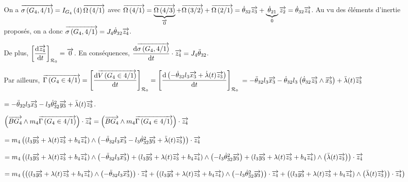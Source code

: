 \documentclass[10pt,fleqn]{article} %
\begin{document}
On a $\overrightarrow{\sigma \left( {G_4}, {4} /{1}\right)} =I_{G_4}\left( 4\right) \overrightarrow{\Omega\left( {4}/{1}\right)}$ avec $\overrightarrow{\Omega\left( {4}/{1}\right)}=\underbrace{\overrightarrow{\Omega\left( {4}/{3}\right)}}_{\overrightarrow{0}}+\overrightarrow{\Omega\left( {3}/{2}\right)}+\overrightarrow{\Omega\left( {2}/{1}\right)} =\dot{\theta}_{32} \overrightarrow{z_3}+\underbrace{\dot{\theta}_{21}}_{0} \overrightarrow{z_2}=\dot{\theta}_{32} \overrightarrow{z_4}$. Au vu des éléments d'inertie proposés, on a donc 
$\overrightarrow{\sigma \left( {G_4}, {4} /{1}\right)}=J_4\dot{\theta}_{32} \overrightarrow{z_4}$.

De plus, $ \left[ \dfrac{ \text{d} \overrightarrow{z_4}}{\text{d} t} \right]_{\mathcal{R}_{0}} = \overrightarrow{0} $. 
En conséquences, $\dfrac{\text{d} \overrightarrow{\sigma \left( {G_4}, {4} /{1}\right)}}{\text{d} t} \cdot\overrightarrow{z_4} = J_4\ddot{\theta}_{32}$.

Par ailleurs, $\overrightarrow{\Gamma \left( {G_4} \in {4}/{1}\right)}= \left[\dfrac{\text{d} \overrightarrow{V\left( {G_4} \in {4}/{1}\right)}}{\text{d} t} \right]_{\mathcal{R}_{0}}=\left[\dfrac{\text{d} \left( -\dot{\theta}_{32}l_3\overrightarrow{x_3}  + \dot{\lambda}(t)\overrightarrow{z_3} \right)}{\text{d} t} \right]_{\mathcal{R}_{0}}$
$= -\ddot{\theta}_{32}l_3\overrightarrow{x_3} -\dot{\theta}_{32}l_3    \left(\dot{\theta}_{32} \overrightarrow{z_3}\wedge \overrightarrow{x_3} \right)  + \ddot{\lambda}(t)\overrightarrow{z_3}  $

$= -\ddot{\theta}_{32}l_3\overrightarrow{x_3} -l_3   \dot{\theta}_{32}^2  \overrightarrow{y_3} + \ddot{\lambda}(t)\overrightarrow{z_3}  $.

$\left(\overrightarrow{BG_4}\wedge m_4 \overrightarrow{\Gamma \left( {G_4} \in {4}/{1}\right)}\right)\cdot\overrightarrow{z_4} = 
\left(\overrightarrow{BG_4}\wedge m_4 \overrightarrow{\Gamma \left( {G_4} \in {4}/{1}\right)}\right)\cdot\overrightarrow{z_4} $

$= m_4\left( \left(l_3 \overrightarrow{y_3} + \lambda(t) \overrightarrow{z_3}+ b_4 \overrightarrow{z_4}\right) \wedge  \left(-\ddot{\theta}_{32}l_3\overrightarrow{x_3} -l_3   \dot{\theta}_{32}^2  \overrightarrow{y_3} + \ddot{\lambda}(t)\overrightarrow{z_3} \right) \right)\cdot \overrightarrow{z_4}$

$= m_4\left( \left(l_3 \overrightarrow{y_3} + \lambda(t) \overrightarrow{z_3}+ b_4 \overrightarrow{z_4}\right) \wedge  \left(-\ddot{\theta}_{32}l_3\overrightarrow{x_3}\right)  + \left(l_3 \overrightarrow{y_3} + \lambda(t) \overrightarrow{z_3}+ b_4 \overrightarrow{z_4}\right) \wedge  \left(-l_3   \dot{\theta}_{32}^2  \overrightarrow{y_3}\right) + \left(l_3 \overrightarrow{y_3} + \lambda(t) \overrightarrow{z_3}+ b_4 \overrightarrow{z_4}\right) \wedge  \left(\ddot{\lambda}(t)\overrightarrow{z_3}\right) \right) \cdot \overrightarrow{z_4}$

$= m_4\left(\left( \left(l_3 \overrightarrow{y_3} + \lambda(t) \overrightarrow{z_3}+ b_4 \overrightarrow{z_4}\right) \wedge  \left(-\ddot{\theta}_{32}l_3\overrightarrow{x_3}\right) \right) \cdot \overrightarrow{z_4} 
 + \left(\left(l_3 \overrightarrow{y_3} + \lambda(t) \overrightarrow{z_3}+ b_4 \overrightarrow{z_4}\right) \wedge  \left(-l_3   \dot{\theta}_{32}^2  \overrightarrow{y_3}\right)\right) \cdot \overrightarrow{z_4}
  +\left( \left(l_3 \overrightarrow{y_3} + \lambda(t) \overrightarrow{z_3}+ b_4 \overrightarrow{z_4}\right) \wedge  \left(\ddot{\lambda}(t)\overrightarrow{z_3}\right) \right) \cdot \overrightarrow{z_4}\right)$
  
\end{document}
